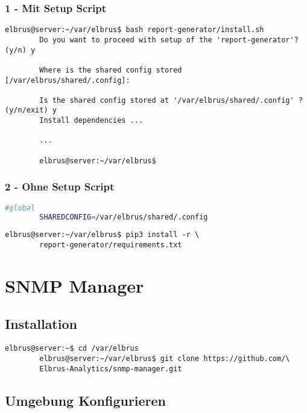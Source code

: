 \documentclass{article}
\begin{document}
	\subsubsection{1 - Mit Setup Script}
	
	\begin{lstlisting}[caption={Ausführen des 'install.sh' Scripts.}]
		elbrus@server:~/var/elbrus$ bash report-generator/install.sh
		Do you want to proceed with setup of the 'report-generator'? (y/n) y
		
		Where is the shared config stored [/var/elbrus/shared/.config]:
		
		Is the shared config stored at '/var/elbrus/shared/.config' ? (y/n/exit) y
		Install dependencies ...
		
		...
		
		elbrus@server:~/var/elbrus$
	\end{lstlisting}

	\subsubsection{2 - Ohne Setup Script}
	\begin{lstlisting}[caption={Anhand von '.env.example' eigene '.env' Datei anlegen.}, language=bash]
		#global
		SHAREDCONFIG=/var/elbrus/shared/.config
	\end{lstlisting}
	
	\begin{lstlisting}[caption={Installieren von fehlenden python3 Packages.}]
		elbrus@server:~/var/elbrus$ pip3 install -r \
		report-generator/requirements.txt
	\end{lstlisting}
	\newpage
	
	\section{SNMP Manager}
	\lstset{style=commands}
	\subsection{Installation}
	\begin{lstlisting}[caption={Clonen der Software von GitHub.}]
		elbrus@server:~$ cd /var/elbrus
		elbrus@server:~/var/elbrus$ git clone https://github.com/\
		Elbrus-Analytics/snmp-manager.git
	\end{lstlisting}

	\subsection[file config]{Umgebung Konfigurieren}
\end{document}

